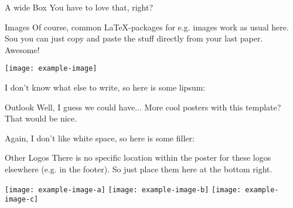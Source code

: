 \documentclass[
  a0paper,
  portrait,
  fontscale=.35 %
  ]{baposterrptu}
\begin{document}
\begin{poster}
\begin{posterbox}[name=widebox,column=0,below=intro, span=2]{A wide Box}
    You have to love that, right?
  \end{posterbox}

  \begin{posterbox}[below=widebox, column=0]{Images}
    Of course, common \LaTeX-packages for e.g. images work as usual here. Sou you can just copy and paste the stuff directly from your last paper. Awesome!\vspace{1em}

    \texttt{[image: example-image]}\vspace{1em}

    I don't know what else to write, so here is some lipsum:
    \lipsum[1][1-5]
  \end{posterbox}

  \begin{posterbox}[name=outlook, below=widebox, column=1]{Outlook}
    Well, I guess we could have... More cool posters with this template? That would be nice.\vspace{1em}

    Again, I don't like white space, so here is some filler:
    \lipsum[1]
  \end{posterbox}

  \begin{posterbox}[above=bottom, column=1]{Other Logos}
    There is no specific location within the poster for these logos elsewhere (e.g. in the footer). So just place them here at the bottom right.\vspace{1em}

    \texttt{[image: example-image-a]}\hfill
    \texttt{[image: example-image-b]}\hfill
    \texttt{[image: example-image-c]}
  \end{posterbox}

\end{poster}
\end{document}
